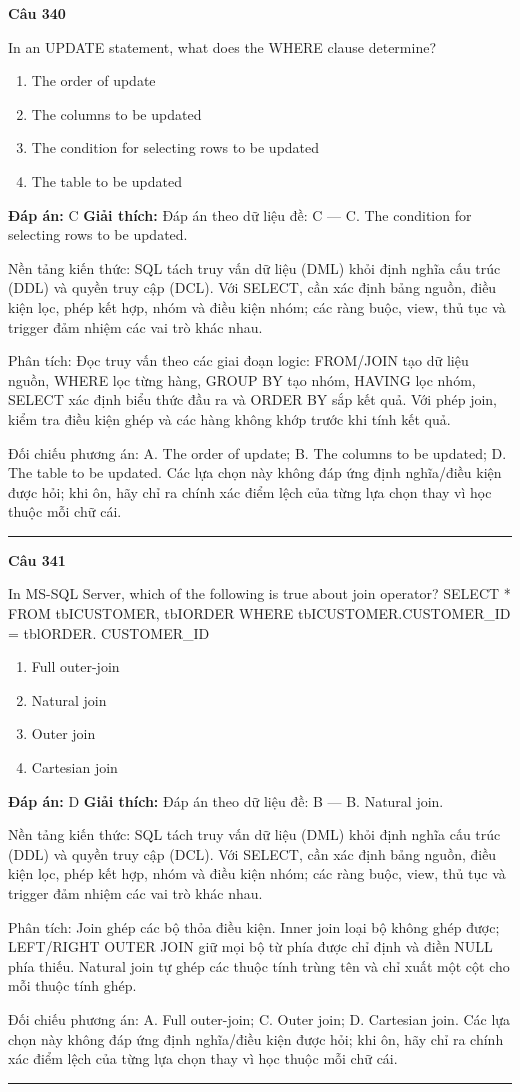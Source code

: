\documentclass[11pt,a4paper]{article}
\newenvironment{question}[1]{%
  \par\vspace{1em}\noindent\textbf{\large Câu #1}\par\vspace{0.4em}
}{%
  \par\vspace{1em}\hrule\vspace{0.6em}
}
\newenvironment{choices}{%
  \begin{enumerate}[label=\textbf{\Alph*.},leftmargin=2.2em,itemsep=2pt,topsep=3pt]
}{%
  \end{enumerate}
}
\newcommand{\choice}{\item}
\begin{document}
\begin{question}{340}
In an UPDATE statement, what does the WHERE clause determine?
\begin{choices}
\choice The order of update
\choice The columns to be updated
\choice The condition for selecting rows to be updated
\choice The table to be updated
\end{choices}
\textbf{Đáp án:} C
\textbf{Giải thích:} Đáp án theo dữ liệu đề: C — C. The condition for selecting rows to be updated.

Nền tảng kiến thức: SQL tách truy vấn dữ liệu (DML) khỏi định nghĩa cấu trúc (DDL) và quyền truy cập (DCL). Với SELECT, cần xác định bảng nguồn, điều kiện lọc, phép kết hợp, nhóm và điều kiện nhóm; các ràng buộc, view, thủ tục và trigger đảm nhiệm các vai trò khác nhau.

Phân tích: Đọc truy vấn theo các giai đoạn logic: FROM/JOIN tạo dữ liệu nguồn, WHERE lọc từng hàng, GROUP BY tạo nhóm, HAVING lọc nhóm, SELECT xác định biểu thức đầu ra và ORDER BY sắp kết quả. Với phép join, kiểm tra điều kiện ghép và các hàng không khớp trước khi tính kết quả.

Đối chiếu phương án: A. The order of update; B. The columns to be updated; D. The table to be updated. Các lựa chọn này không đáp ứng định nghĩa/điều kiện được hỏi; khi ôn, hãy chỉ ra chính xác điểm lệch của từng lựa chọn thay vì học thuộc mỗi chữ cái.
\end{question}


\begin{question}{341}
In MS-SQL Server, which of the following is true about join operator?
SELECT *
FROM tbICUSTOMER, tbIORDER
WHERE tbICUSTOMER.CUSTOMER_ID = tblORDER. CUSTOMER_ID
\begin{choices}
\choice Full outer-join
\choice Natural join
\choice Outer join
\choice Cartesian join
\end{choices}
\textbf{Đáp án:} D
\textbf{Giải thích:} Đáp án theo dữ liệu đề: B — B. Natural join.

Nền tảng kiến thức: SQL tách truy vấn dữ liệu (DML) khỏi định nghĩa cấu trúc (DDL) và quyền truy cập (DCL). Với SELECT, cần xác định bảng nguồn, điều kiện lọc, phép kết hợp, nhóm và điều kiện nhóm; các ràng buộc, view, thủ tục và trigger đảm nhiệm các vai trò khác nhau.

Phân tích: Join ghép các bộ thỏa điều kiện. Inner join loại bộ không ghép được; LEFT/RIGHT OUTER JOIN giữ mọi bộ từ phía được chỉ định và điền NULL phía thiếu. Natural join tự ghép các thuộc tính trùng tên và chỉ xuất một cột cho mỗi thuộc tính ghép.

Đối chiếu phương án: A. Full outer-join; C. Outer join; D. Cartesian join. Các lựa chọn này không đáp ứng định nghĩa/điều kiện được hỏi; khi ôn, hãy chỉ ra chính xác điểm lệch của từng lựa chọn thay vì học thuộc mỗi chữ cái.
\end{question}
\end{document}
